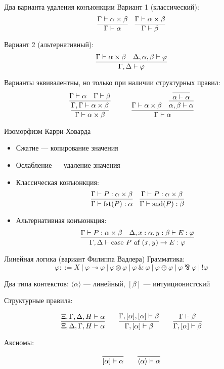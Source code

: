 \documentclass[aspectratio=169,dvipsnames,usenames]{beamer}
\begin{document}
\begin{frame}{Два варианта удаления конъюнкции}
Вариант 1 (классический):
$$\infer{\Gamma\vdash\alpha}{\Gamma\vdash\alpha\times\beta}\quad\infer{\Gamma\vdash\beta}{\Gamma\vdash\alpha\times\beta}$$

Вариант 2 (альтернативный):
$$\infer{\Gamma,\Delta\vdash\varphi}{\Gamma\vdash\alpha\times\beta\quad\Delta,\alpha,\beta\vdash\varphi}$$

Варианты эквивалентны, но только при наличии структурных правил:
$$\infer{\Gamma\vdash \alpha \times \beta}{\infer{\Gamma,\Gamma\vdash\alpha \times \beta}{\Gamma\vdash\alpha\quad\Gamma\vdash\beta}}
\quad\quad\quad
\infer{\Gamma\vdash\alpha}{\Gamma\vdash\alpha\times\beta\quad\infer{\alpha,\beta\vdash\alpha}{\infer{\alpha\vdash\alpha}{}}}
$$
\end{frame}

\begin{frame}{Изоморфизм Карри-Ховарда}
\begin{itemize}
\item Сжатие --- копирование значения
\item Ослабление --- удаление значения
\item Классическая конъюнкция:
$$\infer{\Gamma\vdash \text{fst}(P):\alpha}{\Gamma\vdash P:\alpha\times\beta}\quad\infer{\Gamma\vdash \text{snd}(P):\beta}{\Gamma\vdash P:\alpha\times\beta}$$

\item Альтернативная конъюнкция:
$$\infer{\Gamma,\Delta\vdash \text{case } P \text{ of }(x,y) \rightarrow E : \varphi}{\Gamma\vdash P:\alpha\times\beta\quad\Delta, x: \alpha, y: \beta\vdash E:\varphi}$$
\end{itemize}
\end{frame}

\begin{frame}{Линейная логика (вариант Филиппа Вадлера)}
Грамматика:
$$\varphi ::= X\ |\ \varphi\multimap\varphi\ |\ \varphi\otimes\varphi\ |\ \varphi\ \&\ \varphi\ |\ \varphi\oplus\varphi\ |\ \varphi\bindnasrepma\varphi\ |\ !\varphi$$

Два типа контекстов:
$\langle \alpha \rangle$ --- линейный,
$[\beta]$ --- интуиционистский

Структурные правила:

$$\infer{\Xi,\Delta,\Gamma,H\vdash\alpha}{\Xi,\Gamma,\Delta,H\vdash\alpha}\quad\quad
  \infer{\Gamma,[\alpha]\vdash\beta}{\Gamma,[\alpha],[\alpha]\vdash\beta}\quad\quad
  \infer{\Gamma,[\alpha]\vdash\beta}{\Gamma\vdash\beta}$$

Аксиомы:

$$\infer{[\alpha]\vdash\alpha}{}\quad\quad\infer{\langle\alpha\rangle\vdash\alpha}{}$$


\end{frame}
\end{document}

